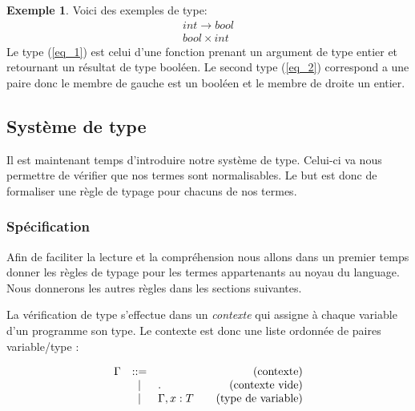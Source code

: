 \documentclass {article}
\makeatletter
\theoremstyle{definition}
\newtheorem{example}{Exemple}
\theoremstyle{remark}
\newenvironment{bnf}
               {\[\begin{array}{lcl@{\qquad}r}}
               {\end{array}\]}
\makeatother
\begin{document}
\begin{example}
  Voici des exemples de type:
  \begin{eqnarray}
    int \rightarrow bool  \label{eq_1}  \\
    bool \times int \label{eq_2} 
  \end{eqnarray}
  Le type (\ref{eq_1}) est celui d'une fonction prenant un argument de type entier et 
  retournant un résultat de type booléen.
  Le second type (\ref{eq_2}) correspond a une paire donc le membre de gauche est un booléen
  et le membre de droite un entier.
\end{example}


\subsection{Système de type}

Il est maintenant temps d'introduire notre système de type. Celui-ci va nous permettre de vérifier que nos termes 
sont normalisables. Le but est donc de formaliser une règle de typage pour chacuns de nos termes.

\subsubsection{Spécification}

Afin de faciliter la lecture et la compréhension nous allons dans 
un premier temps donner les règles de typage pour les termes appartenants au noyau 
du language. Nous donnerons les autres règles dans les sections suivantes.

La vérification de type s'effectue dans un \emph{contexte} qui assigne
à chaque variable d'un programme son type. Le contexte est donc une
liste ordonnée de paires variable/type :
%

\begin{bnf}
  \Gamma &::=& &\mbox{(contexte)} \\
         &|& . & \mbox{(contexte vide)} \\
         &|& \Gamma, x : T & \mbox{(type de variable)} 
\end{bnf}
\end{document}
